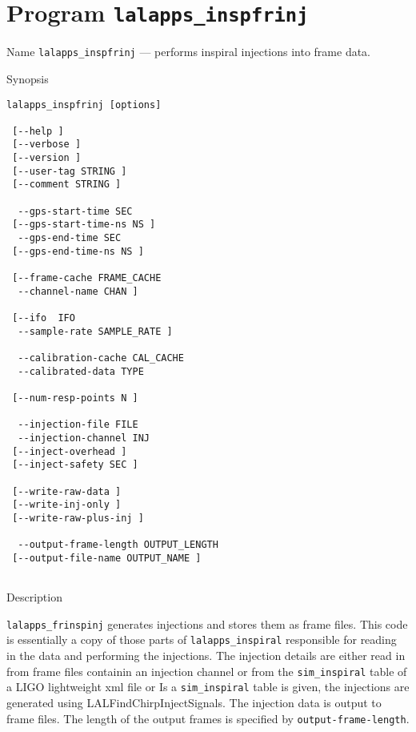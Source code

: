\section{Program \texttt{lalapps\_inspfrinj}}
\label{program:lalapps-inspfrinj}

\begin{entry}
\item[Name]
\verb$lalapps_inspfrinj$ --- performs inspiral injections into frame data.

\item[Synopsis]
\begin{verbatim}
lalapps_inspfrinj [options]
 
 [--help ]       
 [--verbose ]   
 [--version ]  
 [--user-tag STRING ]     
 [--comment STRING ]    
 
  --gps-start-time SEC
 [--gps-start-time-ns NS ] 
  --gps-end-time SEC     
 [--gps-end-time-ns NS ] 
 
 [--frame-cache FRAME_CACHE    
  --channel-name CHAN ]  
 
 [--ifo  IFO       
  --sample-rate SAMPLE_RATE ] 

  --calibration-cache CAL_CACHE 
  --calibrated-data TYPE  
  
 [--num-resp-points N ]   
 
  --injection-file FILE
  --injection-channel INJ
 [--inject-overhead ]  
 [--inject-safety SEC ]
 
 [--write-raw-data ] 
 [--write-inj-only ]
 [--write-raw-plus-inj ]
 
  --output-frame-length OUTPUT_LENGTH
 [--output-file-name OUTPUT_NAME ]
 
\end{verbatim}

\item[Description] 

\texttt{lalapps\_frinspinj} generates injections and stores them as
frame files.  This code is essentially a copy of those parts of
\texttt{lalapps\_inspiral} responsible for reading in the data and
performing the injections.  The injection details are either read in
from frame files containin an injection channel or from the
\texttt{sim\_inspiral} table of a LIGO lightweight xml file or Is a
\texttt{sim\_inspiral} table is given, the injections are generated
using LALFindChirpInjectSignals.  The injection data is output to frame
files.  The length of the output frames is specified by
\texttt{output-frame-length}.


\end{entry}
